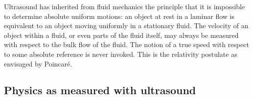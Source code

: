 \documentclass[10pt, fleqn,final,showtrims,oldfontcommands, article,a4paper,oneside]{memoir} %
\newcommand{\secref}[1]{section~\ref{sec:#1}}
\newcommand{\Poincare}{Poincar{\'e}\xspace}
\begin{document}
Ultrasound has inherited from fluid mechanics the principle that it is impossible to determine absolute uniform motions:
an object at rest in a laminar flow is equivalent to an object moving uniformly in a stationary fluid.
The velocity of an object within a fluid, or even parts of the fluid itself, may always be measured with respect to the bulk flow of the fluid.
The notion of a true speed with respect to some absolute reference is never  invoked.
This is the relativity postulate as envisaged by \Poincare.







\subsection{Physics as measured with ultrasound}
\end{document}
